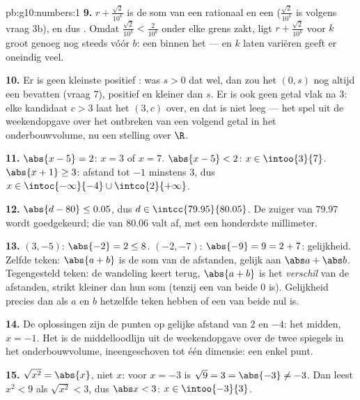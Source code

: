 \begin{solution}{pb:g10:numbers:1}
\textbf{9.} $r + \frac{\sqrt2}{10^k}$ is de som van een rationaal en een
 ($\frac{\sqrt2}{10^k}$ is  volgens vraag 3b),
en dus . Omdat $\frac{\sqrt2}{10^k} < \frac{2}{10^k}$ onder elke
grens zakt, ligt $r + \frac{\sqrt2}{10^k}$ voor $k$ groot genoeg nog steeds
vóór $b$: een  binnen het  --- en $k$ laten
variëren geeft er oneindig veel.

\textbf{10.} Er is geen kleinste positief : was $s > 0$ dat wel,
dan zou het  $(0, s)$ nog altijd een  bevatten
(vraag 7), positief en kleiner dan $s$. Er is ook geen getal vlak na $3$:
elke kandidaat $c > 3$ laat het  $(3, c)$ over, en dat is niet leeg
--- het spel uit de weekendopgave over het ontbreken van een volgend getal
in het onderbouwvolume, nu een stelling over $\R$.

\textbf{11.} $\abs{x - 5} = 2$: $x = 3$ of $x = 7$.
$\abs{x - 5} < 2$: $x \in \intoo{3}{7}$.
$\abs{x + 1} \geq 3$: afstand tot $-1$ minstens $3$, dus
$x \in \intoc{-\infty}{-4} \cup \intco{2}{+\infty}$.

\textbf{12.} $\abs{d - 80} \leq 0.05$, dus
$d \in \intcc{79.95}{80.05}$. De zuiger van $79.97$ wordt goedgekeurd; die
van $80.06$ valt af, met een honderdste millimeter.

\textbf{13.} $(3, -5)$: $\abs{-2} = 2 \leq 8$. $(-2, -7)$:
$\abs{-9} = 9 = 2 + 7$: gelijkheid. Zelfde teken: $\abs{a + b}$ is de som
van de afstanden, gelijk aan $\abs a + \abs b$. Tegengesteld teken: de
wandeling keert terug, $\abs{a + b}$ is het \emph{verschil} van de
afstanden, strikt kleiner dan hun som (tenzij een van beide $0$ is).
Gelijkheid precies dan als $a$ en $b$ hetzelfde teken hebben of een van
beide nul is.

\textbf{14.} De oplossingen zijn de punten op gelijke afstand van $2$ en
$-4$: het midden, $x = -1$. Het is de middelloodlijn uit de weekendopgave
over de twee spiegels in het onderbouwvolume, ineengeschoven tot één
dimensie: een enkel punt.

\textbf{15.} $\sqrt{x^2} = \abs{x}$, niet $x$: voor $x = -3$ is
$\sqrt{9} = 3 = \abs{-3} \neq -3$. Dan leest $x^2 < 9$ als
$\sqrt{x^2} < 3$, dus $\abs x < 3$: $x \in \intoo{-3}{3}$.


\end{solution}
